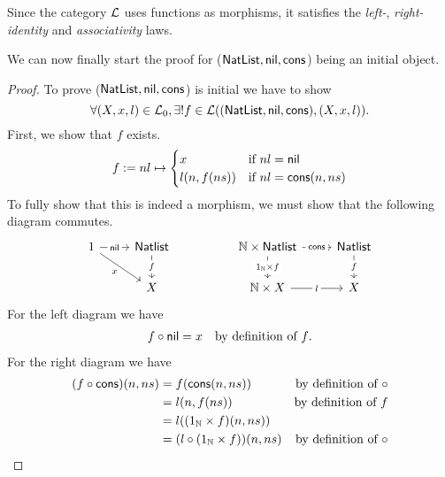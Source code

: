 \begin{solution}
		Since the category $\mathcal{L}$ uses functions as morphisms,
		it satisfies the \textit{left-}, \textit{right-identity} and \textit{associativity} laws.

		We can now finally start the proof for ($\mathsf{NatList}, \mathsf{nil}, \mathsf{cons}$) being an initial object.

		\begin{proof}
			To prove ($\mathsf{NatList}, \mathsf{nil}, \mathsf{cons}$) is initial we have to show
			\[
				\forall (X, x, l) \in \mathcal{L}_0, \exists! f \in \mathcal{L}((\mathsf{NatList}, \mathsf{nil}, \mathsf{cons}), (X, x, l)).
			\]
			First, we show that $f$ exists.
			\[
				f := nl \mapsto \begin{cases}
          x             & \text{if $nl = \mathsf{nil}$ }             \\
					l (n, f (ns)) & \text{if $nl = \mathsf{cons} (n, ns)$}
				\end{cases}
			\]
			To fully show that this is indeed a morphism, we must show that the following diagram commutes.
			\[
				\begin{tikzcd}
					1 & \mathsf{Natlist} && {\NN \times \mathsf{Natlist}} & \mathsf{Natlist} \\
					& {X} && {\NN \times X} & {X}
          \arrow["{\nil}"{description}, from=1-1, to=1-2]
					\arrow["x"', from=1-1, to=2-2]
					\arrow["f"{description}, from=1-2, to=2-2]
          \arrow["{\cons}"{description}, from=1-4, to=1-5]
					\arrow["l"{description}, from=2-4, to=2-5]
					\arrow["f"{description}, from=1-5, to=2-5]
					\arrow["{1_\NN \times f}"{description}, from=1-4, to=2-4]
				\end{tikzcd}
			\]
			For the left diagram we have
			\begin{align*}
				f \circ \mathsf{nil} & = x & \text{by definition of $f$}.
			\end{align*}
			For the right diagram we have
			\begin{align*}
				(f \circ \mathsf{cons}) (n, ns) & = f (\mathsf{cons} (n, ns))                 & \text{by definition of $\circ$} \\
				                                & = l (n, f(ns))                              & \text{by definition of $f$}     \\
				                                & = l ((1_{\mathbb{N}} \times f) (n, ns))       &                                 \\
				                                & = (l \circ (1_{\mathbb{N}} \times f)) (n, ns) & \text{by definition of $\circ$}
			\end{align*}


\end{proof}
\end{solution}
